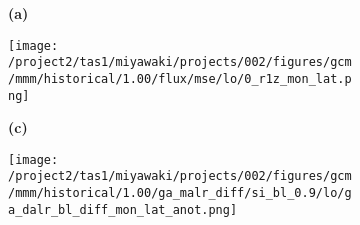 \documentclass[preview]{standalone}
\begin{document}
\begin{figure}

  \begin{subfigure}[t]{0.05\textwidth}
    \textbf{\large{(a)}}
  \end{subfigure}
  \begin{subfigure}[t]{0.95\textwidth}
    \texttt{[image: /project2/tas1/miyawaki/projects/002/figures/gcm/mmm/historical/1.00/flux/mse/lo/0\_r1z\_mon\_lat.png]}
  \end{subfigure}
  
  \begin{subfigure}[t]{0.05\textwidth}
    \textbf{\large{(c)}}
  \end{subfigure}
  \begin{subfigure}[t]{0.95\textwidth}
    \texttt{[image: /project2/tas1/miyawaki/projects/002/figures/gcm/mmm/historical/1.00/ga\_malr\_diff/si\_bl\_0.9/lo/ga\_dalr\_bl\_diff\_mon\_lat\_anot.png]}
  \end{subfigure}
  
\end{figure}
  
\end{document}
